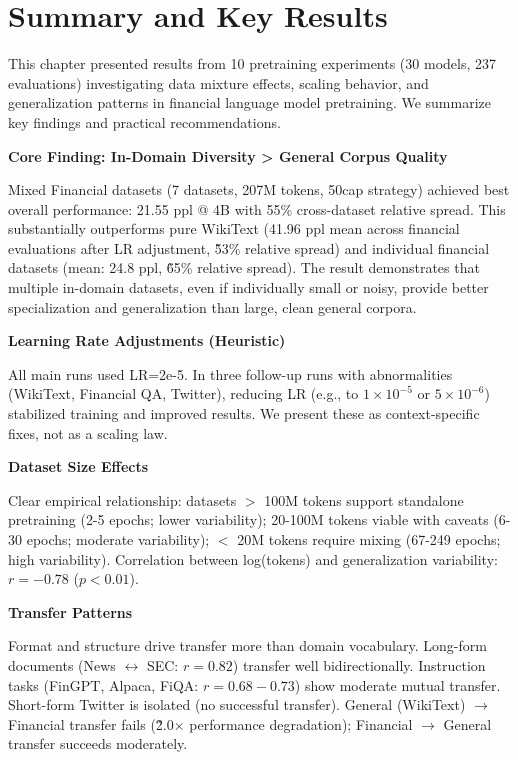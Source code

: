 \section{Summary and Key Results}

This chapter presented results from 10 pretraining experiments (30 models, 237 evaluations) investigating data mixture effects, scaling behavior, and generalization patterns in financial language model pretraining. We summarize key findings and practical recommendations.

\textbf{Core Finding: In-Domain Diversity > General Corpus Quality}

Mixed Financial datasets (7 datasets, 207M tokens, 50cap strategy) achieved best overall performance: 21.55 ppl @ 4B with 55\% cross-dataset relative spread. This substantially outperforms pure WikiText (41.96 ppl mean across financial evaluations after LR adjustment, \~53\% relative spread) and individual financial datasets (mean: 24.8 ppl, \~65\% relative spread). The result demonstrates that multiple in-domain datasets, even if individually small or noisy, provide better specialization and generalization than large, clean general corpora.

\textbf{Learning Rate Adjustments (Heuristic)}

All main runs used LR=2e-5. In three follow-up runs with abnormalities (WikiText, Financial QA, Twitter), reducing LR (e.g., to $1\times10^{-5}$ or $5\times10^{-6}$) stabilized training and improved results. We present these as context-specific fixes, not as a scaling law.

\textbf{Dataset Size Effects}

Clear empirical relationship: datasets $>$ 100M tokens support standalone pretraining (2-5 epochs; lower variability); 20-100M tokens viable with caveats (6-30 epochs; moderate variability); $<$ 20M tokens require mixing (67-249 epochs; high variability). Correlation between log(tokens) and generalization variability: $r = -0.78$ ($p < 0.01$).

\textbf{Transfer Patterns}

Format and structure drive transfer more than domain vocabulary. Long-form documents (News $\leftrightarrow$ SEC: $r = 0.82$) transfer well bidirectionally. Instruction tasks (FinGPT, Alpaca, FiQA: $r = 0.68-0.73$) show moderate mutual transfer. Short-form Twitter is isolated (no successful transfer). General (WikiText) $\to$ Financial transfer fails (\~2.0$\times$ performance degradation); Financial $\to$ General transfer succeeds moderately.

